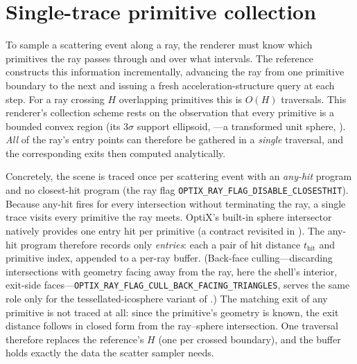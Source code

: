 \section{Single-trace primitive collection}
\label{sec:collection}

To sample a scattering event along a ray, the renderer must know which primitives the ray passes
through and over what intervals. The reference constructs this information incrementally, advancing the
ray from one primitive boundary to the next and issuing a fresh acceleration-structure query at each
step. For a ray crossing $H$ overlapping primitives this is $O(H)$ traversals. This renderer's
collection scheme rests on the observation that every primitive is a bounded convex
region (its $3\sigma$ support ellipsoid, ---a
transformed unit sphere, ). \emph{All} of the ray's entry points can therefore be
gathered in a \emph{single} traversal, and the corresponding exits then computed analytically.

Concretely, the scene is traced once per scattering event with an \emph{any-hit} program and no
closest-hit program (the ray flag \texttt{OPTIX\_\allowbreak RAY\_\allowbreak FLAG\_\allowbreak DISABLE\_\allowbreak CLOSESTHIT}). Because any-hit
fires for every intersection without terminating the ray, a single trace visits every primitive the
ray meets. OptiX's built-in sphere intersector natively provides one entry hit per primitive (a contract
revisited in ). The any-hit program therefore records only \emph{entries}:
each a pair of hit distance $t_{\text{hit}}$ and primitive index, appended to a
per-ray buffer. (Back-face culling---discarding intersections with geometry facing away from the ray,
here the shell's interior, exit-side faces---\texttt{OPTIX\_\allowbreak RAY\_\allowbreak FLAG\_\allowbreak CULL\_\allowbreak BACK\_\allowbreak FACING\_\allowbreak TRIANGLES}, serves the same role only for the tessellated-icosphere variant of .) The matching exit of
any primitive is not traced at all: since the primitive's geometry is known, the exit distance follows
in closed form from the ray--sphere intersection. One traversal therefore replaces the reference's
$H$ (one per crossed boundary), and the buffer holds exactly the data the scatter sampler needs.

